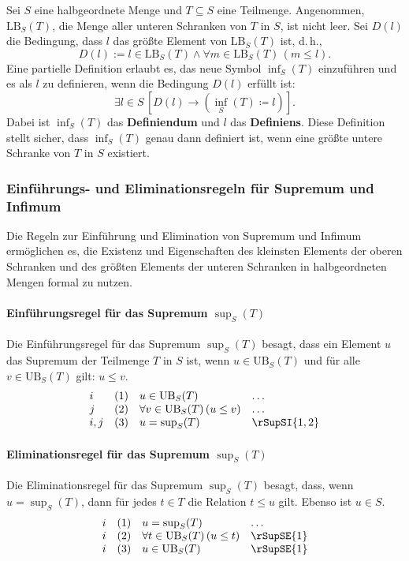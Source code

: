 \documentclass[main.tex]{subfiles}
\begin{document}
\begin{definition}[Infimum]
    Sei \( S \) eine halbgeordnete Menge und \( T \subseteq S \) eine Teilmenge. Angenommen, \(\text{LB}_S(T)\), die Menge aller unteren Schranken von \( T \) in \( S \), ist nicht leer. Sei \( D(l) \) die Bedingung, dass \( l \) das größte Element von \(\text{LB}_S(T)\) ist, d.\,h.,
    \[
    D(l) := l \in \text{LB}_S(T) \land \forall m \in \text{LB}_S(T) \, (m \leq l).
    \]
    Eine partielle Definition erlaubt es, das neue Symbol \(\inf_S(T)\) einzuführen und es als \( l \) zu definieren, wenn die Bedingung \( D(l) \) erfüllt ist:
    \[
    \exists l \in S \, [ D(l) \rightarrow (\inf_S(T) \coloneqq l) ].
    \]
    Dabei ist \(\inf_S(T)\) das \textbf{Definiendum} und \( l \) das \textbf{Definiens}. Diese Definition stellt sicher, dass \(\inf_S(T)\) genau dann definiert ist, wenn eine größte untere Schranke von \( T \) in \( S \) existiert.
\end{definition}

\subsubsection{Einführungs- und Eliminationsregeln für Supremum und Infimum}
\label{rule:rSupSI} \label{rule:rSupSE} \label{rule:rInfSI} \label{rule:rInfSE}

Die Regeln zur Einführung und Elimination von Supremum und Infimum ermöglichen es, die Existenz und Eigenschaften des kleinsten Elements der oberen Schranken und des größten Elements der unteren Schranken in halbgeordneten Mengen formal zu nutzen.

\paragraph{Einführungsregel für das Supremum \(\sup_S(T)\)}
Die Einführungsregel für das Supremum \(\sup_S(T)\) besagt, dass ein Element \( u \) das Supremum der Teilmenge \( T \) in \( S \) ist, wenn \( u \in \text{UB}_S(T) \) und für alle \( v \in \text{UB}_S(T) \) gilt: \( u \leq v \).
\[
\begin{array}{llll}
    i   & (1) & u \in \text{UB}_S(T) & \dots \\
    j   & (2) & \forall v \in \text{UB}_S(T) \, (u \leq v) & \dots \\
    i,j & (3) & u = \sup_S(T) & \rSupSI{1,2}
\end{array}
\]

\paragraph{Eliminationsregel für das Supremum \(\sup_S(T)\)}
Die Eliminationsregel für das Supremum \(\sup_S(T)\) besagt, dass, wenn \( u = \sup_S(T) \), dann für jedes \( t \in T \) die Relation \( t \leq u \) gilt. Ebenso ist \( u \in S \).
\[
\begin{array}{llll}
    i & (1) & u = \sup_S(T) & \dots \\
    i & (2) & \forall t \in \text{UB}_S(T) \, (u \leq t) & \rSupSE{1} \\
    i & (3) & u \in \text{UB}_S(T) & \rSupSE{1}
\end{array}
\]
\end{document}
